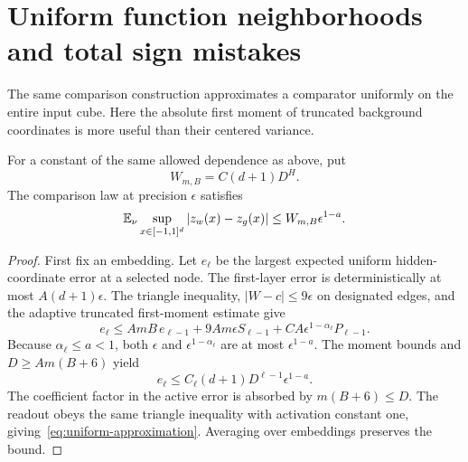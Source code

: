 \section{Uniform function neighborhoods and total sign mistakes}
\label{sec:uniform}
The same comparison construction approximates a comparator uniformly on the entire input cube. Here the absolute first moment of truncated background coordinates is more useful than their centered variance.

\begin{lemma}\label{lem:uniform-approximation}
For a constant of the same allowed dependence as above, put
\[
 W_{m,B}=C(d+1)D^H.
\]
The comparison law at precision $\epsilon$ satisfies
\begin{equation}
 \mathbb E_\nu\sup_{x\in[-1,1]^d}|z_w(x)-z_g(x)|
 \le W_{m,B}\epsilon^{1-a}.
 \label{eq:uniform-approximation}
\end{equation}
\end{lemma}
\begin{proof}
First fix an embedding. Let $e_\ell$ be the largest expected uniform hidden-coordinate error at a selected node. The first-layer error is deterministically at most $A(d+1)\epsilon$. The triangle inequality, $|W-c|\le9\epsilon$ on designated edges, and the adaptive truncated first-moment estimate give
\[
 e_\ell\le AmB\,e_{\ell-1}
      +9Am\epsilon S_{\ell-1}
      +CA\epsilon^{1-\alpha_\ell}P_{\ell-1}.
\]
Because $\alpha_\ell\le a<1$, both $\epsilon$ and $\epsilon^{1-\alpha_\ell}$ are at most $\epsilon^{1-a}$. The moment bounds and $D\ge Am(B+6)$ yield
\[
 e_\ell\le C_\ell(d+1)D^{\ell-1}\epsilon^{1-a}.
\]
The coefficient factor in the active error is absorbed by $m(B+6)\le D$. The readout obeys the same triangle inequality with activation constant one, giving~\eqref{eq:uniform-approximation}. Averaging over embeddings preserves the bound.
\end{proof}

